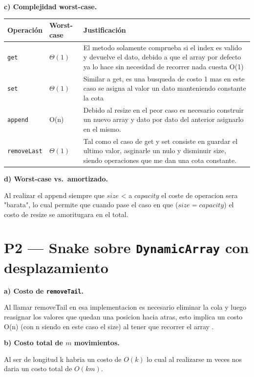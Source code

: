 \documentclass[11pt,a4paper]{article}
\newcommand{\sub}[2]{\medskip\par\noindent\textbf{#1) #2.}\ }
\begin{document}
\sub{c}{Complejidad worst-case}\par\smallskip
\renewcommand{\arraystretch}{2}
\begin{center}
\small
\begin{tabular}{@{}L{0.16\textwidth}L{0.2\textwidth}L{0.55\textwidth}@{}}
\toprule
Operación & Worst-case & Justificación\\
\midrule
\texttt{get}       & $\Theta(1)$  & El metodo solamente comprueba si el index es valido y devuelve el dato, debido a que el array por defecto ya lo hace sin necesidad de recorrer nada cuesta O(1) \\ 
\texttt{set}        & $\Theta(1)$ & Similar a get, es una busqueda de costo 1 mas en este caso se asigna al valor un dato manteniendo constante la cota\\
\texttt{append}     & O(n) & Debido al resize en el peor caso es necesario construir un nuevo array y dato por dato del anterior asignarlo en el mismo.\\
\texttt{removeLast} & $\Theta(1)$ & Tal como el caso de get y set consiste en guardar el ultimo valor, asginarle un nulo y disminuir size, siendo operaciones que me dan una cota constante.\\
\bottomrule
\end{tabular}
\end{center}
\renewcommand{\arraystretch}{1}


\sub{d}{Worst-case vs.\ amortizado}

Al realizar el append siempre que $size$ < a $capacity$ el coste de operacion sera "barata", lo cual permite que cuando pase el caso en que ($size = capacity$) el costo de resize se amoritugara en el total.

\section*{P2 --- Snake sobre \texttt{DynamicArray} con desplazamiento}

\sub{a}{Costo de \texttt{removeTail}}

Al llamar removeTail en esa implementacion es necesario eliminar la cola y luego reasignar los valores que quedan una posicion hacia atras, esto implica un costo O(n) (con n siendo en este caso el size) al tener que recorrer el array .

\sub{b}{Costo total de $m$ movimientos}

Al ser de longitud k habria un costo de $O(k)$ lo cual al realizarse m veces nos daria un costo total de $O(km)$.
\end{document}
